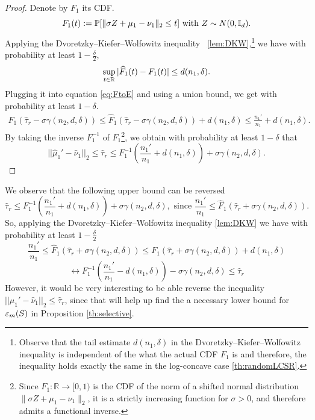 \begin{proof}
Denote by $F_1$ its CDF.
\begin{equation}
    F_1(t):= \mathbb{P}[\|\sigma Z + \mu_1- \nu_1\|_2 \leq t] \text{ with } Z \sim N(0, \mathbb{I}_d). 
\end{equation}
Applying the Dvoretzky–Kiefer–Wolfowitz inequality ~\ref{lem:DKW},\footnote{Observe that the tail estimate $d(n_1, \delta)$ in the Dvoretzky–Kiefer–Wolfowitz inequality is independent of the what the actual CDF $F_1$ is and therefore, the inequality holds   exactly the same in the log-concave case \ref{th:randomLCSR}.} we have with probability at least $1-\tfrac{\delta}{2}$,
\begin{equation}
    \sup_{t\in \mathbb{R}}|\widehat{F}_1(t) - F_1(t)| \leq d(n_1, \delta).
\end{equation}
Plugging it into equation \ref{eq:FtoE} and using a union bound, we get with probability at least $1-\delta$.
\begin{align}
    F_1(\hat{\tau}_r - \sigma \gamma(n_2,d, \delta)) \leq 
    \widehat{F}_1(\hat{\tau}_r - \sigma \gamma(n_2,d, \delta)) + d(n_1, \delta) \leq  \frac{n_1'}{n_1} +  d(n_1, \delta)  .
\end{align}
By taking the inverse $F^{-1}_1$ of  $F_1$\footnote{Since $F_1: \mathbb{R} \to [0,1)$ is the CDF of the norm of a shifted normal distribution $\|\sigma Z + \mu_1- \nu_1\|_2$, it is a strictly increasing function for $\sigma >0$, and therefore admits a functional inverse.}, we obtain with probability at least $1-\delta$ that
\begin{equation} \label{eq:UpperboundSR}
   ||\hat{\mu}_1' - \hat{\nu}_1||_2 \leq  \hat{\tau}_r \leq F_1^{-1}{\left(\frac{n_1'}{n_1} + d(n_1, \delta)\right)} + \sigma \gamma(n_2,d, \delta).
\end{equation}
\end{proof}

\begin{remark} \label{rem:UBSR}
We observe that the following upper bound can be reversed 
\[
\hat{\tau}_r \leq F_1^{-1}{\left(\frac{n_1'}{n_1} + d(n_1, \delta)\right)} + \sigma \gamma(n_2,d, \delta), \text{ since } 
\frac{n_1'}{n_1} \leq \widehat{F}_1(\hat{\tau}_r + \sigma \gamma(n_2,d,\delta)).
\]
So, applying the Dvoretzky–Kiefer–Wolfowitz inequality  \ref{lem:DKW} we have with probability at least $1-\frac{\delta}{2}$
\[
 \frac{n_1'}{n_1} 
 \leq 
 \widehat{F}_1(\hat{\tau}_r + \sigma \gamma(n_2,d,\delta))
 \leq 
 F_1(\hat{\tau}_r+ \sigma \gamma(n_2,d,\delta))  + d(n_1, \delta)  
\]
\[
\leftrightarrow 
F_1^{-1}\left(\frac{n_1'}{n_1} -d(n_1, \delta)\right) - \sigma \gamma(n_2, d,\delta) \leq \hat{\tau}_r
\]
However, it would be very interesting to be able reverse the inequality $||\hat{\mu}_1' - \hat{\nu}_1||_2 \leq  \hat{\tau}_r$, since that will help up find the a necessary lower bound for $\varepsilon_m(S)$ in Proposition \ref{th:selective}.
\end{remark}

